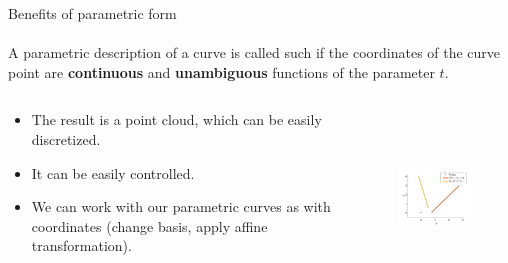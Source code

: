 \documentclass[aspectratio=169,notes]{beamer}
\begin{document}
\begin{frame}[t]{Benefits of parametric form}
\framesubtitle{}
    \begin{definition}
        A parametric description of a curve is called such if the coordinates of the curve point are \textbf{continuous} and \textbf{unambiguous} functions of the parameter $t$.
    \end{definition}
    \begin{columns}[T,onlytextwidth]
        \begin{column}{0.59\textwidth}
            \begin{itemize}
                \item The result is a point cloud, which can be easily discretized.
                \item It can be easily controlled.
                \item We can work with our parametric curves as with coordinates (change basis, apply affine transformation).
            \end{itemize}
        \end{column}
        \begin{column}{0.39\textwidth}
            \vspace{-0.9cm}
            \begin{figure}[H]
                \centering\includegraphics[height=4.6cm,width=1\textwidth,keepaspectratio]{line_example.png}
                \label{fig:line_example.png}
            \end{figure}
        \end{column}
    \end{columns}

\end{frame}
\end{document}
